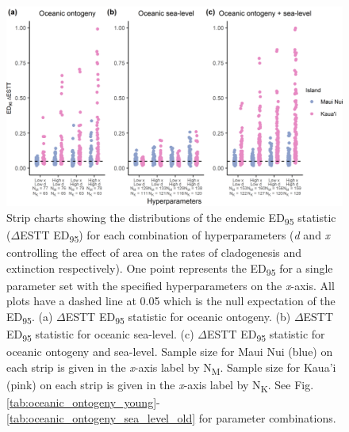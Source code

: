 \begin{figure}
    \centering
    \includegraphics{Hyperparameters_endemic.png}
    \caption{Strip charts showing the distributions of the endemic ED\textsubscript{95} statistic ($\Delta$ESTT ED\textsubscript{95}) for each combination of hyperparameters (\textit{d} and \textit{x} controlling the effect of area on the rates of cladogenesis and extinction respectively). One point represents the ED\textsubscript{95} for a single parameter set with the specified hyperparameters on the \textit{x}-axis. All plots have a dashed line at 0.05 which is the null expectation of the ED\textsubscript{95}. (a) $\Delta$ESTT ED\textsubscript{95} statistic for oceanic ontogeny. (b) $\Delta$ESTT ED\textsubscript{95} statistic for oceanic sea-level. (c) $\Delta$ESTT ED\textsubscript{95} statistic for oceanic ontogeny and sea-level. Sample size for Maui Nui (blue) on each strip is given in the \textit{x}-axis label by N\textsubscript{M}. Sample size for Kaua'i (pink) on each strip is given in the \textit{x}-axis label by N\textsubscript{K}. See Fig. \ref{tab:oceanic_ontogeny_young}-\ref{tab:oceanic_ontogeny_sea_level_old} for parameter combinations.}
    \label{fig:Hyperparameters_endemic}
\end{figure}

